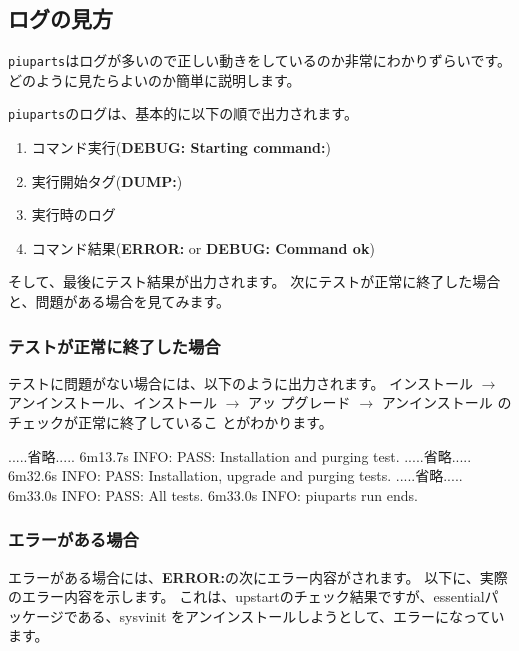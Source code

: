\documentclass[mingoth,a4paper]{jsarticle}
\begin{document}
\subsection{ログの見方}
\texttt{piuparts}はログが多いので正しい動きをしているのか非常にわかりずらいです。
どのように見たらよいのか簡単に説明します。

\texttt{piuparts}のログは、基本的に以下の順で出力されます。
\begin{enumerate}
\item コマンド実行({\bf DEBUG: Starting command:})
\item 実行開始タグ({\bf DUMP:})
\item 実行時のログ
\item コマンド結果({\bf ERROR:} or {\bf DEBUG: Command ok})
\end{enumerate}
そして、最後にテスト結果が出力されます。
次にテストが正常に終了した場合と、問題がある場合を見てみます。

\subsubsection{テストが正常に終了した場合}

テストに問題がない場合には、以下のように出力されます。
インストール $\rightarrow$ アンインストール、インストール $\rightarrow$ アッ
プグレード $\rightarrow$ アンインストール のチェックが正常に終了しているこ
とがわかります。
\begin{commandline}
.....省略.....
6m13.7s INFO: PASS: Installation and purging test.
.....省略.....
6m32.6s INFO: PASS: Installation, upgrade and purging tests.
.....省略.....
6m33.0s INFO: PASS: All tests.
6m33.0s INFO: piuparts run ends.
\end{commandline}

\subsubsection{エラーがある場合}

エラーがある場合には、{\bf ERROR:}の次にエラー内容がされます。
以下に、実際のエラー内容を示します。
これは、upstartのチェック結果ですが、essentialパッケージである、sysvinit
をアンインストールしようとして、エラーになっています。
\end{document}
